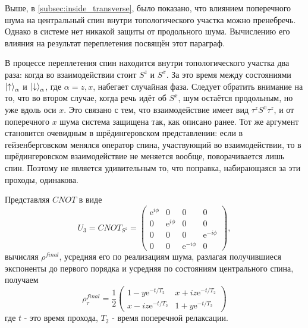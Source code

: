 \documentclass[a4paper,12pt]{article}
\theoremstyle{plain} %
\theoremstyle{definition} %
\theoremstyle{remark} %
\begin{document}
Выше, в \ref{subsec:inside_transverse}, было показано, что влиянием поперечного шума на центральный спин внутри топологического участка можно пренебречь. Однако в системе нет никакой защиты от продольного шума. Вычислению его влияния на результат переплетения посвящён этот параграф.

В процессе переплетения спин находится внутри топологического участка два раза: когда во взаимодействии стоит $S^z$ и $S^x$.
За это время между состояниями $\ket{\uparrow}_\alpha$ и $\ket{\downarrow}_\alpha$, где $\alpha = z, x$, набегает случайная фаза.
Следует обратить внимание на то, что во втором случае, когда речь идёт об $S^x$, шум остаётся продольным, но уже вдоль оси $x$. 
Это связано с тем, что взаимодействие имеет вид $\tau^z S^x \tau^z$, и от поперечного $x$ шума система защищена так, как описано ранее. 
Тот же аргумент становится очевидным в шрёдингеровском представлении: если в гейзенберговском менялся оператор спина, участвующий во взаимодействии, то в шрёдингеровском взаимодействие не меняется вообще, поворачивается лишь спин.
Поэтому не является удивительным то, что поправка, набирающаяся за эти проходы, одинакова.

Представляя $CNOT$ в виде
\begin{equation}
    U_3 = CNOT_{S^z} = 
    \begin{pmatrix}
        \mathrm{e}^{i \phi} & 0 & 0 & 0 \\
        0 & \mathrm{e}^{i \phi} & 0 & 0 \\
        0 & 0 & 0 & \mathrm{e}^{-i \phi} \\
        0 & 0 & \mathrm{e}^{-i \phi} & 0
    \end{pmatrix},
\end{equation}
вычисляя $\rho^{final}$, усредняя его по реализациям шума, разлагая получившиеся экспоненты до первого порядка и усредняя по состояниям центрального спина, получаем
\begin{equation}
    \rho^{final}_\tau = \frac{1}{2}
    \begin{pmatrix}
        1 - y \mathrm{e}^{-t/T_2} & x + i z \mathrm{e}^{-t/T_2} \\
        x - i z \mathrm{e}^{-t/T_2} & 1 + y \mathrm{e}^{-t/T_2}
    \end{pmatrix}
\end{equation}
где $t$ - это время прохода, $T_2$ - время поперечной релаксации. 
\pagebreak



\end{document}
